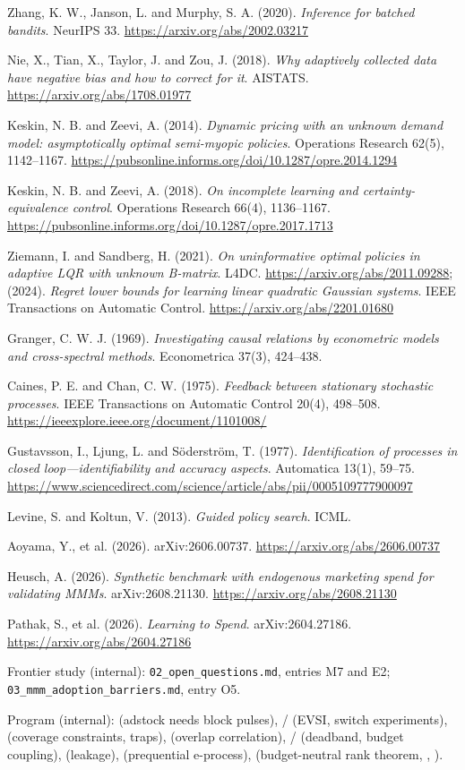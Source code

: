\begin{enumerate}[label={[\arabic*]},leftmargin=2.5em]
\item Zhang, K. W., Janson, L. and Murphy, S. A. (2020). \emph{Inference for batched bandits}. NeurIPS 33. \url{https://arxiv.org/abs/2002.03217}
\item Nie, X., Tian, X., Taylor, J. and Zou, J. (2018). \emph{Why adaptively collected data have negative bias and how to correct for it}. AISTATS. \url{https://arxiv.org/abs/1708.01977}
\item Keskin, N. B. and Zeevi, A. (2014). \emph{Dynamic pricing with an unknown demand model: asymptotically optimal semi-myopic policies}. Operations Research 62(5), 1142--1167. \url{https://pubsonline.informs.org/doi/10.1287/opre.2014.1294}
\item Keskin, N. B. and Zeevi, A. (2018). \emph{On incomplete learning and certainty-equivalence control}. Operations Research 66(4), 1136--1167. \url{https://pubsonline.informs.org/doi/10.1287/opre.2017.1713}
\item Ziemann, I. and Sandberg, H. (2021). \emph{On uninformative optimal policies in adaptive LQR with unknown B-matrix}. L4DC. \url{https://arxiv.org/abs/2011.09288}; (2024). \emph{Regret lower bounds for learning linear quadratic Gaussian systems}. IEEE Transactions on Automatic Control. \url{https://arxiv.org/abs/2201.01680}
\item Granger, C. W. J. (1969). \emph{Investigating causal relations by econometric models and cross-spectral methods}. Econometrica 37(3), 424--438.
\item Caines, P. E. and Chan, C. W. (1975). \emph{Feedback between stationary stochastic processes}. IEEE Transactions on Automatic Control 20(4), 498--508. \url{https://ieeexplore.ieee.org/document/1101008/}
\item Gustavsson, I., Ljung, L. and S\"oderstr\"om, T. (1977). \emph{Identification of processes in closed loop---identifiability and accuracy aspects}. Automatica 13(1), 59--75. \url{https://www.sciencedirect.com/science/article/abs/pii/0005109777900097}
\item Levine, S. and Koltun, V. (2013). \emph{Guided policy search}. ICML.
\item Aoyama, Y., et al. (2026). arXiv:2606.00737. \url{https://arxiv.org/abs/2606.00737}
\item Heusch, A. (2026). \emph{Synthetic benchmark with endogenous marketing spend for validating MMMs}. arXiv:2608.21130. \url{https://arxiv.org/abs/2608.21130}
\item Pathak, S., et al. (2026). \emph{Learning to Spend}. arXiv:2604.27186. \url{https://arxiv.org/abs/2604.27186}
\item Frontier study (internal): \texttt{02\_open\_questions.md}, entries M7 and E2; \texttt{03\_mmm\_adoption\_barriers.md}, entry O5.
\item Program (internal):  (adstock needs block pulses), / (EVSI, switch experiments),  (coverage constraints, traps),  (overlap correlation), / (deadband, budget coupling),  (leakage),  (prequential e-process),  (budget-neutral rank theorem, , ).
\end{enumerate}
\endgroup
